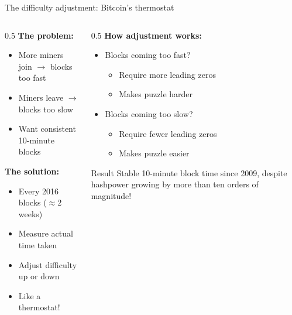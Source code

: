 \ifdefined\PRESENTATION\else\PassOptionsToClass{handout}{beamer}\fi\documentclass[aspectratio=169, lualatex]{beamer}
\begin{document}
\begin{frame}{The difficulty adjustment: Bitcoin's thermostat}
	\begin{columns}[c]
		\begin{column}{0.5\textwidth}
			\textbf{The problem:}
			\begin{itemize}
				\item More miners join $\rightarrow$ blocks too fast
				\item Miners leave $\rightarrow$ blocks too slow
				\item Want consistent 10-minute blocks
			\end{itemize}
			\textbf{The solution:}
			\begin{itemize}
				\item Every 2016 blocks ($\approx$2 weeks)
				\item Measure actual time taken
				\item Adjust difficulty up or down
				\item Like a thermostat!
			\end{itemize}
		\end{column}
		\begin{column}{0.5\textwidth}
			\textbf{How adjustment works:}
			\begin{itemize}
				\item Blocks coming too fast?
				      \begin{itemize}
					      \item Require more leading zeros
					      \item Makes puzzle harder
				      \end{itemize}
				\item Blocks coming too slow?
				      \begin{itemize}
					      \item Require fewer leading zeros
					      \item Makes puzzle easier
				      \end{itemize}
			\end{itemize}
			\begin{alertblock}{Result}
				Stable 10-minute block time since 2009, despite hashpower growing by more than ten orders of magnitude!
			\end{alertblock}
		\end{column}
	\end{columns}
\end{frame}
\end{document}
